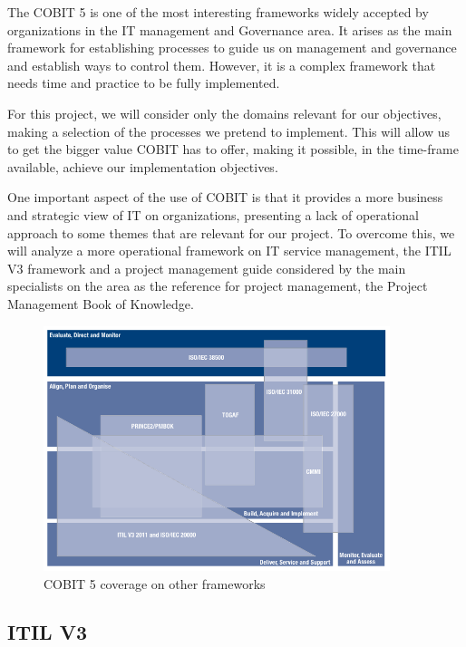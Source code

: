 The COBIT 5 is one of the most interesting frameworks widely accepted by organizations in the IT management and Governance area. It arises as the main framework for establishing processes to guide us on management and governance and establish ways to control them. However, it is a complex framework that needs time and practice to be fully implemented.\par
For this project, we will consider only the domains relevant for our objectives, making a selection of the processes we pretend to implement. This will allow us to get the bigger value COBIT has to offer, making it possible, in the time-frame available, achieve our implementation objectives.\par
One important aspect of the use of COBIT is that it provides a more business and strategic view of IT on organizations, presenting a lack of operational approach to some themes that are relevant for our project. To overcome this, we will analyze a more operational framework on IT service management, the ITIL V3 framework\cite{itilIntro,itilSS,itilST,itilSD,itilSO,itilCSI} and a project management guide considered by the main specialists on the area as the reference for project management, the Project Management Book of Knowledge\cite{pmbok5}.\par

\begin{figure}
\centering
\includegraphics[width=0.9\textwidth]{img/COBITOtherFrameworks.png}
\caption{COBIT 5 coverage on other frameworks}
\end{figure}

\subsection{ITIL V3}

